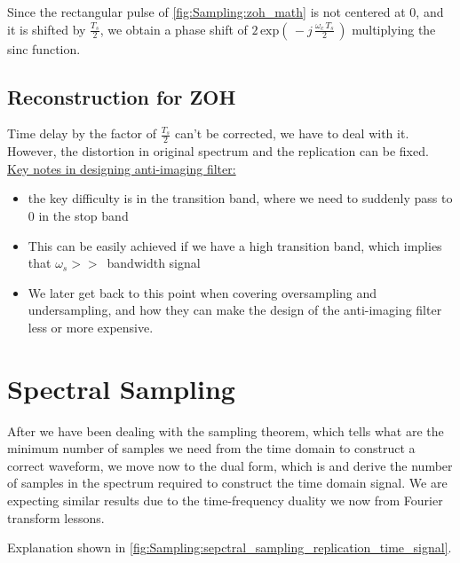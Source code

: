 Since the rectangular pulse of \autoref{fig:Sampling:zoh_math} is not centered at 0, and it is shifted by $\displaystyle\frac{T_s}{2}$, we obtain a phase shift of $ 2 \, \text{exp}\left( \, -j \, \displaystyle\frac{\omega_c \, T_s}{2} \, \right)$ multiplying the sinc function.


\subsection{Reconstruction for ZOH}


Time delay by the factor of  $\displaystyle\frac{T_s}{2}$ can't be corrected, we have to deal with it. However, the distortion in original spectrum and the replication can be fixed.\\

\underline{Key notes in designing anti-imaging filter:}

\begin{itemize}

\item the key difficulty is in the transition band, where we need to suddenly pass to 0 in the stop band

\item This can be easily achieved if we have a high transition band, which implies that $\omega_s >> \,$ bandwidth signal

\item We later get back to this point when covering oversampling and undersampling, and how they can make the design of the anti-imaging filter less or more expensive.

\end{itemize}




\newpage
\section{Spectral Sampling}
\label{Sec:Sampling:Sepctral_Sampling}


After we have been dealing with the sampling theorem, which tells what are the minimum number of samples we need from the time domain to construct a correct waveform, we move now to the dual form, which is  and derive the number of samples in the spectrum required to construct the time domain signal. We are expecting similar results due to the time-frequency duality we now from Fourier transform lessons.

Explanation shown in \autoref{fig:Sampling:sepctral_sampling_replication_time_signal}.



